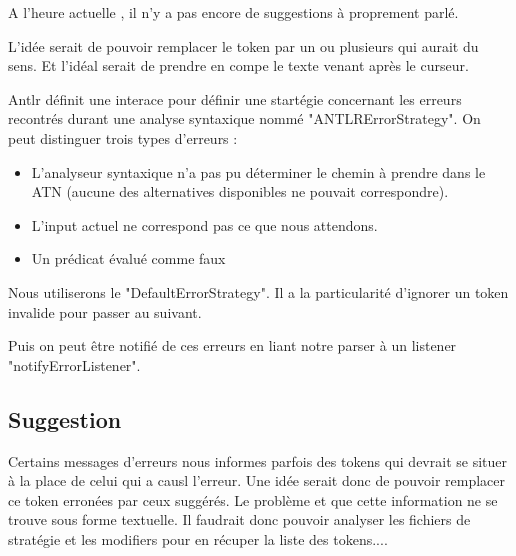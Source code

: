 \documentclass[
    iict, %
    il, %
]{heig-tb}
\begin{document}
A l'heure actuelle , il n'y a pas encore de suggestions à proprement parlé.

L'idée serait de pouvoir remplacer le token par un ou plusieurs qui aurait du sens.
Et l'idéal serait de prendre en compe le texte venant après le curseur.





Antlr définit une interace pour définir une startégie concernant les erreurs recontrés durant une analyse syntaxique nommé "ANTLRErrorStrategy".
On peut distinguer trois types d'erreurs :
\begin{itemize}
    \item L'analyseur syntaxique n'a pas pu déterminer le chemin à prendre dans le ATN (aucune des alternatives disponibles ne pouvait correspondre).
    \item L'input actuel ne correspond pas ce que nous attendons.
    \item Un prédicat évalué comme faux
\end{itemize}

Nous utiliserons le "DefaultErrorStrategy". Il a la particularité d'ignorer un token invalide pour passer au suivant.

Puis on peut être notifié de ces erreurs en liant notre parser à un listener "notifyErrorListener".




\subsection{Suggestion}
Certains messages d'erreurs nous informes parfois des tokens qui devrait se situer à la place de celui qui a causl l'erreur.
Une idée serait donc de pouvoir remplacer ce token erronées par ceux suggérés.
Le problème et que cette information ne se trouve sous forme textuelle.
Il faudrait donc pouvoir analyser les fichiers de stratégie et les modifiers pour en récuper la liste des tokens....
\end{document}
